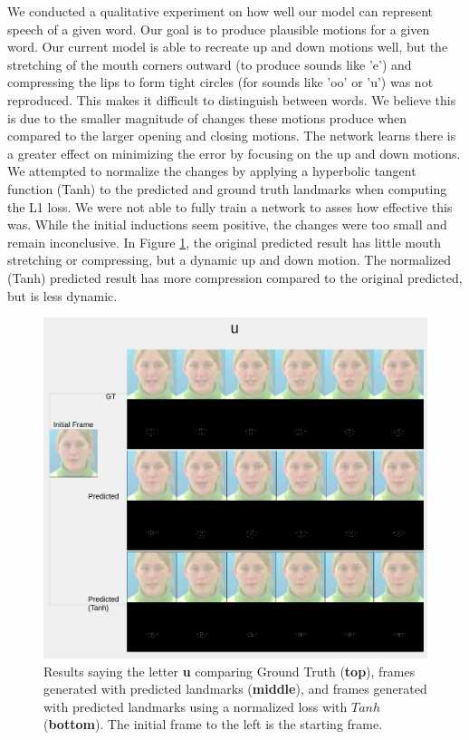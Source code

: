 \documentclass[10pt,twocolumn,letterpaper]{article}
\begin{document}
 We conducted a qualitative experiment on how well our model can represent speech of a given word. Our goal is to produce plausible motions for a given word. Our current model is able to recreate up and down motions well, but the stretching of the mouth corners outward (to produce sounds like 'e') and compressing the lips to form tight circles (for sounds like 'oo' or 'u') was not reproduced. This makes it difficult to distinguish between words. We believe this is due to the smaller magnitude of changes these motions produce when compared to the larger opening and closing motions. The network learns there is a greater effect on minimizing the error by focusing on the up and down motions. We attempted to normalize the changes by applying a hyperbolic tangent function (Tanh) to the predicted and ground truth landmarks when computing the L1 loss. We were not able to fully train a network to asses how effective this was. While the initial inductions seem positive, the changes were too small and remain inconclusive. In Figure \ref{fig:tanh}, the original predicted result has little mouth stretching or compressing, but a dynamic up and down motion. The normalized (Tanh) predicted result has more compression compared to the original predicted, but is less dynamic.
 
 \begin{figure}[t]
 	\begin{center}
 		\includegraphics [scale=0.33] {images/tanh.png}
 	\end{center}
 	\caption{Results saying the letter \textbf{u} comparing Ground Truth (\textbf{top}), frames generated with predicted landmarks (\textbf{middle}), and frames generated with predicted landmarks using a normalized loss with $Tanh$ (\textbf{bottom}). The initial frame to the left is the starting frame.}
 	\label{fig:tanh}
 \end{figure}
\end{document}
